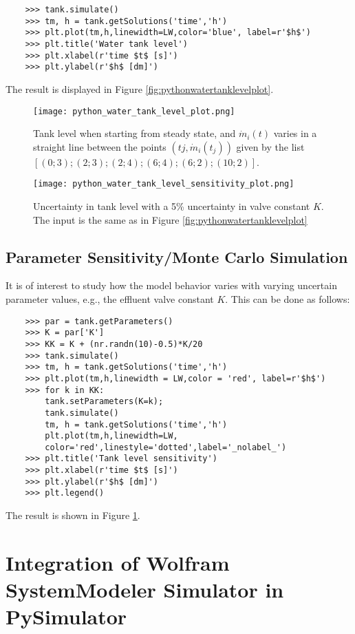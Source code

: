 \begin{lstlisting}
	>>> tank.simulate()
	>>> tm, h = tank.getSolutions('time','h')
	>>> plt.plot(tm,h,linewidth=LW,color='blue', label=r'$h$')
	>>> plt.title('Water tank level')
	>>> plt.xlabel(r'time $t$ [s]')
	>>> plt.ylabel(r'$h$ [dm]')
\end{lstlisting}

The result is displayed in Figure \ref{fig:pythonwatertanklevelplot}.

\begin{figure}
	\texttt{[image: python\_water\_tank\_level\_plot.png]}
	\caption{Tank level when starting from steady state, and $\dot{m}_i(t)$ varies in a straight line between the points $(tj,\dot{m}_i(t_j ))$
		given by the list $[(0; 3); (2; 3); (2; 4); (6; 4); (6; 2); (10; 2)]$.}
	\label{fig:pythonwatertanklevelplot}
	\texttt{[image: python\_water\_tank\_level\_sensitivity\_plot.png]}
	\caption{Uncertainty in tank level with a 5\% uncertainty in valve constant $K$. The input is the same as in Figure \ref{fig:pythonwatertanklevelplot}}
	\label{fig:pythonwatertanklevelsensitivityplot}
\end{figure}

\subsection{Parameter Sensitivity/Monte Carlo Simulation}
\label{subsec:pythonparametersensitivity}

It is of interest to study how the model behavior varies with varying uncertain parameter values, e.g., the effluent
valve constant $K$. This can be done as follows:

\begin{lstlisting}
	>>> par = tank.getParameters()
	>>> K = par['K']
	>>> KK = K + (nr.randn(10)-0.5)*K/20
	>>> tank.simulate()
	>>> tm, h = tank.getSolutions('time','h')
	>>> plt.plot(tm,h,linewidth = LW,color = 'red', label=r'$h$')
	>>> for k in KK:
		tank.setParameters(K=k);
		tank.simulate()
		tm, h = tank.getSolutions('time','h')
		plt.plot(tm,h,linewidth=LW,
		color='red',linestyle='dotted',label='_nolabel_')
	>>> plt.title('Tank level sensitivity')
	>>> plt.xlabel(r'time $t$ [s]')
	>>> plt.ylabel(r'$h$ [dm]')
	>>> plt.legend()
\end{lstlisting}

The result is shown in Figure \ref{fig:pythonwatertanklevelsensitivityplot}.

\section{Integration of Wolfram SystemModeler Simulator in PySimulator}
\label{sec:pythonwolframplugin}

